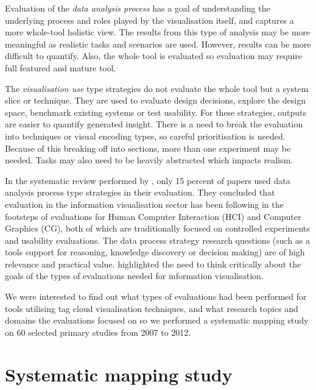 Evaluation of the \emph{data analysis process} has a goal of understanding the underlying process and roles played by the visualisation itself, and captures a more whole-tool holistic view. The results from this type of analysis may be more meaningful as realistic tasks and scenarios are used. However, results can be more difficult to quantify. Also, the whole tool is evaluated so evaluation may require full featured and mature tool.

The \emph{visualisation use} type strategies do not evaluate the whole tool but a system slice or technique. They are used to evaluate design decisions, explore the design space, benchmark existing systems or test usability. For these strategies, outputs are easier to quantify generated insight. There is a need to break the evaluation into techniques or visual encoding types, so careful prioritisation is needed. Because of this breaking off into sections, more than one experiment may be needed. Tasks may also need to be heavily abstracted which impacts realism.

In the systematic review performed by \citet{lam12}, only 15 percent of papers used data analysis process type strategies in their evaluation. They concluded that evaluation in the information visualisation sector has been following in the footsteps of evaluations for Human Computer Interaction (HCI) and Computer Graphics (CG), both of which are traditionally focused on controlled experiments and usability evaluations. The data process strategy research questions (such as a tools support for reasoning, knowledge discovery or decision making) are of high relevance and practical value. \citet{lam12} highlighted the need to think critically about the goals of the types of evaluations needed for information visualisation.

We were interested to find out what types of evaluations had been performed for tools utilising tag cloud visualisation techniques, and what research topics and domains the evaluations focused on so we performed a systematic mapping study on 60 selected primary studies from 2007 to 2012. 


\section{Systematic mapping study}\label{sect:researchquestions}

